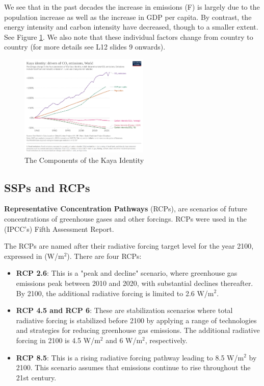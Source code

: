 We see that in the past decades the increase in emissions (F) is largely due to 
the population increase as well as the increase in GDP per capita. By contrast, 
the energy intensity and carbon intensity have decreased, though to a smaller
extent. See Figure \ref{fig:kaya_components}. We also note that these individual
factors change from country to country (for more details see L12 slides 9 onwards).

\begin{figure}[ht]
    \centering
    \includegraphics[width=0.55\textwidth]{figures/kaya-components.png}
    \caption{The Components of the Kaya Identity}
    \label{fig:kaya_components}
\end{figure}

\subsection{SSPs and RCPs}
\label{sec:ssps_rcps}

\textbf{Representative Concentration Pathways} (RCPs), are scenarios of future 
concentrations of greenhouse gases and other forcings. RCPs were used in the 
(\gls{IPCC}'s) Fifth Assessment Report.

The RCPs are named after their radiative forcing target level for the year 2100,
expressed in (W/m$^2$). There are four RCPs: 

\begin{itemize}
    \item \textbf{RCP 2.6}: This is a "peak and decline" scenario, where greenhouse gas
    emissions peak between 2010 and 2020, with substantial declines thereafter. By 
    2100, the additional radiative forcing is limited to 2.6 W/m$^2$.

    \item \textbf{RCP 4.5 and RCP 6}: These are stabilization scenarios where total radiative 
    forcing is stabilized before 2100 by applying a range of technologies and 
    strategies for reducing greenhouse gas emissions. The additional radiative 
    forcing in 2100 is 4.5 W/m$^2$ and 6 W/m$^2$, respectively.

    \item \textbf{RCP 8.5}: This is a rising radiative forcing pathway leading to 8.5 W/m$^2$ by 
    2100. This scenario assumes that emissions continue to rise throughout the 21st
    century.
\end{itemize}

